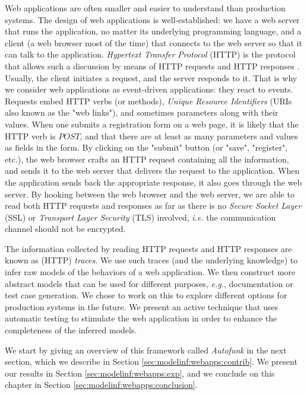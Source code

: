 Web applications are often smaller and easier to understand than
production systems. The design of web applications is
well-established: we have a web server that runs the application,
no matter its underlying programming language, and a client (a
web browser most of the time) that connects to the web server so
that it can talk to the application. \textit{Hypertext Transfer
Protocol} (HTTP)  is the protocol that allows such a discussion by
means of HTTP requests and HTTP responses \cite{RFC7230}.
Usually, the client initiates a request, and the server responds
to it. That is why we consider web applications as event-driven
applications: they react to events. Requests embed HTTP verbs (or
methods), \textit{Unique Resource Identifiers} (URIs also known
as the "web links"), and sometimes parameters along with their
values. When one submits a registration form on a web page, it is
likely that the HTTP verb is $POST$, and that there are at least
as many parameters and values as fields in the form. By clicking
on the "submit" button (or "save", "register", etc.), the web
browser crafts an HTTP request containing all the information,
and sends it to the web server that delivers the request to the
application. When the application sends back the appropriate
response, it also goes through the web server. By hooking between
the web browser and the web server, we are able to read both HTTP
requests and responses as far as there is no \textit{Secure
Socket Layer} (SSL) or \textit{Transport Layer Security} (TLS)
involved, \emph{i.e.} the communication channel should not be encrypted.

The information collected by reading HTTP requests and HTTP
responses are known as (HTTP) \textit{traces}. We use such traces
(and the underlying knowledge) to infer raw models of the
behaviors of a web application. We then construct more abstract
models that can be used for different purposes, \emph{e.g.},
documentation or test case generation. We chose to work on this
to explore different options for production systems in the
future. We present an active technique that uses automatic
testing to stimulate the web application in order to enhance the
completeness of the inferred models.

We start by giving an overview of this framework called
\emph{Autofunk} in the next section, which we describe in Section
\ref{sec:modelinf:webapps:contrib}.  We present our results in
Section \ref{sec:modelinf:webapps:exp}, and we conclude on this
chapter in Section \ref{sec:modelinf:webapps:conclusion}.

